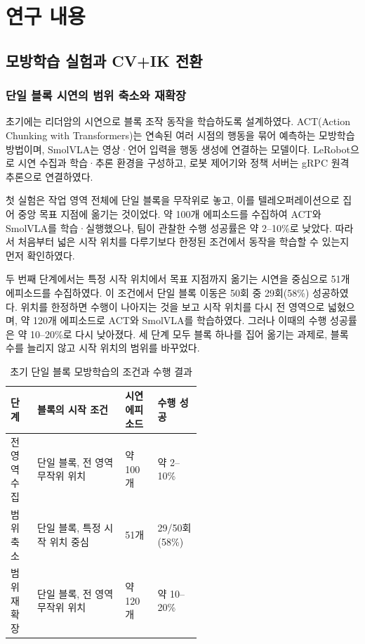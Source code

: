 \chapter{연구 내용}
\section{모방학습 실험과 CV+IK 전환}
\subsection{단일 블록 시연의 범위 축소와 재확장}
초기에는 리더암의 시연으로 블록 조작 동작을 학습하도록 설계하였다. ACT(Action Chunking with Transformers)는 연속된 여러 시점의 행동을 묶어 예측하는 모방학습 방법이며\cite{act}, SmolVLA는 영상·언어 입력을 행동 생성에 연결하는 모델이다\cite{smolvla}. LeRobot으로 시연 수집과 학습·추론 환경을 구성하고, 로봇 제어기와 정책 서버는 gRPC 원격 추론으로 연결하였다.

첫 실험은 작업 영역 전체에 단일 블록을 무작위로 놓고, 이를 텔레오퍼레이션으로 집어 중앙 목표 지점에 옮기는 것이었다. 약 100개 에피소드를 수집하여 ACT와 SmolVLA를 학습·실행했으나, 팀이 관찰한 수행 성공률은 약 2--10\%로 낮았다. 따라서 처음부터 넓은 시작 위치를 다루기보다 한정된 조건에서 동작을 학습할 수 있는지 먼저 확인하였다.

두 번째 단계에서는 특정 시작 위치에서 목표 지점까지 옮기는 시연을 중심으로 51개 에피소드를 수집하였다. 이 조건에서 단일 블록 이동은 50회 중 29회(58\%) 성공하였다. 위치를 한정하면 수행이 나아지는 것을 보고 시작 위치를 다시 전 영역으로 넓혔으며, 약 120개 에피소드로 ACT와 SmolVLA를 학습하였다. 그러나 이때의 수행 성공률은 약 10--20\%로 다시 낮아졌다. 세 단계 모두 블록 하나를 집어 옮기는 과제로, 블록 수를 늘리지 않고 시작 위치의 범위를 바꾸었다.

\begin{table}[htbp]
\centering
\caption{초기 단일 블록 모방학습의 조건과 수행 결과}\label{tab:early}
\begin{tabularx}{\linewidth}{@{}L{0.14\linewidth}YL{0.17\linewidth}L{0.23\linewidth}@{}}
\toprule 단계 & 블록의 시작 조건 & 시연 에피소드 & 수행 성공 \\
\midrule
전 영역 수집 & 단일 블록, 전 영역 무작위 위치 & 약 100개 & 약 2--10\% \\
범위 축소 & 단일 블록, 특정 시작 위치 중심 & 51개 & 29/50회 (58\%) \\
범위 재확장 & 단일 블록, 전 영역 무작위 위치 & 약 120개 & 약 10--20\% \\
\bottomrule
\end{tabularx}
\end{table}

